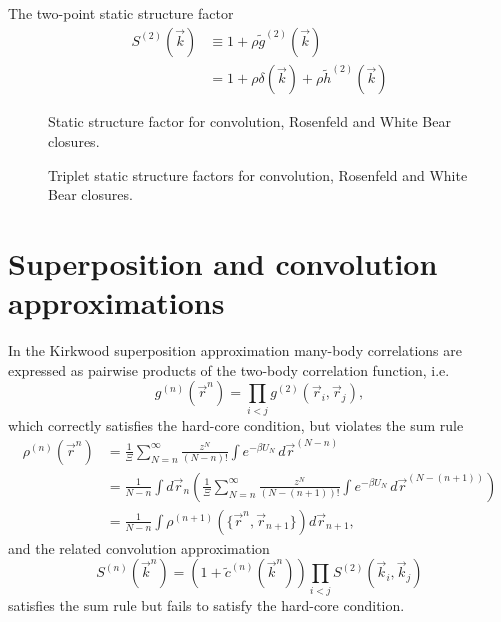 \documentclass[11pt]{report}
\begin{document}
The two-point static structure factor
\begin{equation}
  \begin{aligned}
    S^{(2)}(\vec{k}) &\equiv 1 + \rho \tilde{g}^{(2)}(\vec{k}) \\
    &= 1 + \rho \delta(\vec{k}) + \rho \tilde{h}^{(2)}(\vec{k})
  \end{aligned}
\end{equation}

\begin{figure}
  \missingfigure[figwidth=\linewidth]{}
  \caption{Static structure factor for convolution, Rosenfeld and White Bear closures.}
\end{figure}

\begin{figure}
  \missingfigure[figwidth=\linewidth]{}
  \caption{Triplet static structure factors for convolution, Rosenfeld and White Bear closures.}
\end{figure}

\section{Superposition and convolution approximations}

In the Kirkwood superposition approximation \cite{Kirkwood1935} many-body correlations are expressed as pairwise products of the two-body correlation function, i.e.
\begin{equation}
  g^{(n)}(\vec{r}^n) =
  \prod_{i < j} g^{(2)}(\vec{r}_i, \vec{r}_j),
\end{equation}
which correctly satisfies the hard-core condition, but violates the sum rule
\begin{equation}
  \begin{aligned}
    \rho^{(n)}(\vec{r}^n) &=
    \frac{1}{\Xi} \sum_{N=n}^\infty \frac{z^N}{(N-n)!} \int e^{-\beta U_N} \, d\vec{r}^{(N-n)} \\
    &=
    \frac{1}{N-n}
    \int d\vec{r}_n \left(
    \frac{1}{\Xi} \sum_{N=n}^\infty \frac{z^N}{(N-(n+1))!} \int e^{-\beta U_N} \, d\vec{r}^{(N-(n+1))}
    \right) \\
    &=
    \frac{1}{N-n}
    \int \rho^{(n+1)}(\{\vec{r}^n, \vec{r}_{n+1}\}) d\vec{r}_{n+1},
  \end{aligned}
\end{equation}
and the related convolution approximation \cite{Jackson1962,Ichimaru1970,Barrat1988}%
\begin{equation}
  S^{(n)}(\vec{k}^n) =
  (1 + \tilde{c}^{(n)}(\vec{k}^n))
  \prod_{i < j} S^{(2)}(\vec{k}_i, \vec{k}_j)
\end{equation}
satisfies the sum rule but fails to satisfy the hard-core condition.
\end{document}

